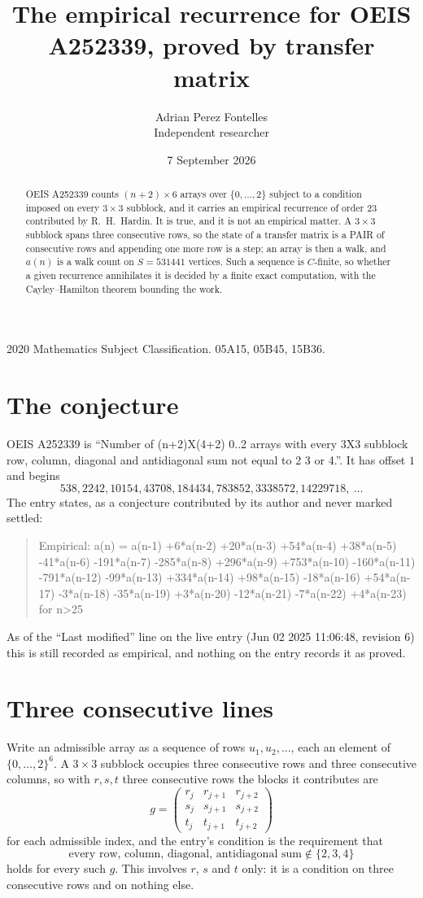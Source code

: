 \documentclass[11pt,a4paper]{article}
\title{The empirical recurrence for OEIS A252339, proved by transfer matrix}
\author{Adrian Perez Fontelles\\ \small Independent researcher}
\date{7 September 2026}
\theoremstyle{plain}
\theoremstyle{definition}
\begin{document}
\maketitle

\begin{abstract}
OEIS A252339 counts $(n+2)\times6$ arrays over $\{0,\dots,2\}$ subject to a condition imposed on
every $3\times3$ subblock, and it carries an empirical recurrence of order $23$
contributed by R.~H.~Hardin. It is true, and it is not an empirical matter. A $3\times3$
subblock spans three consecutive rows, so the state of a transfer matrix is a PAIR of
consecutive rows and appending one more row is a step; an array is then a walk, and
$a(n)$ is a walk count on $S=531441$ vertices. Such a sequence is $C$-finite, so whether a given
recurrence annihilates it is decided by a finite exact computation, with the Cayley--Hamilton
theorem bounding the work.
\end{abstract}

\noindent\small 2020 Mathematics Subject Classification. 05A15, 05B45, 15B36.\normalsize

\section{The conjecture}

OEIS A252339 is ``Number of (n+2)X(4+2) 0..2 arrays with every 3X3 subblock row, column, diagonal and antidiagonal sum not equal to 2 3 or 4.''. It has offset $1$ and begins
\[
538, 2242, 10154, 43708, 184434, 783852, 3338572, 14229718,\ \dots
\]
The entry states, as a conjecture contributed by its author and never marked settled:
\begin{quote}
Empirical: a(n) = a(n-1) +6*a(n-2) +20*a(n-3) +54*a(n-4) +38*a(n-5) -41*a(n-6) -191*a(n-7) -285*a(n-8) +296*a(n-9) +753*a(n-10) -160*a(n-11) -791*a(n-12) -99*a(n-13) +334*a(n-14) +98*a(n-15) -18*a(n-16) +54*a(n-17) -3*a(n-18) -35*a(n-19) +3*a(n-20) -12*a(n-21) -7*a(n-22) +4*a(n-23) for n>25
\end{quote}
As of the ``Last modified'' line on the live entry (Jun 02 2025 11:06:48, revision 6) this is still
recorded as empirical, and nothing on the entry records it as proved.

\section{Three consecutive lines}

Write an admissible array as a sequence of rows $u_1,u_2,\dots$, each an element of
$\{0,\dots,2\}^{6}$. A $3\times3$ subblock occupies three consecutive rows and
three consecutive columns, so with $r,s,t$ three consecutive rows the blocks it
contributes are
\[
g=\begin{pmatrix}r_j&r_{j+1}&r_{j+2}\\ s_j&s_{j+1}&s_{j+2}\\ t_j&t_{j+1}&t_{j+2}\end{pmatrix}
\]
for each admissible index, and the entry's condition is the requirement that
\[
\text{every row, column, diagonal, antidiagonal sum} \notin \{2,3,4\}
\]
holds for every such $g$. This involves $r$, $s$ and $t$ only: it is a condition on
three consecutive rows and on nothing else.
\end{document}
